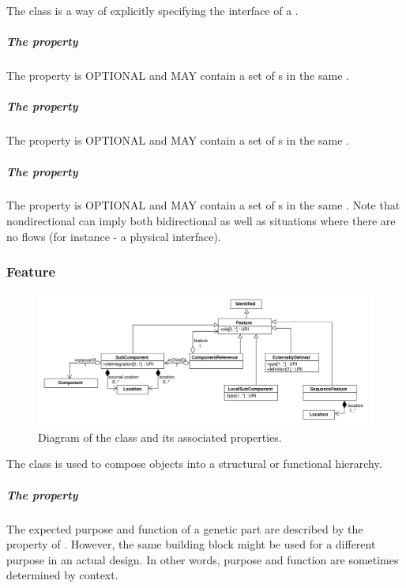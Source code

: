 The  class is a way of explicitly specifying the interface of a . 

\subparagraph{The  property}
\label{sec:input:Interface}
The  property is OPTIONAL and MAY contain a set of  s in the same .
\subparagraph{The  property}
\label{sec:output:Interface}
The  property is OPTIONAL and MAY contain a set of  s in the same .

\subparagraph{The  property}
\label{sec:nondirectional:Interface}
The  property is OPTIONAL and MAY contain a set of  s in the same . Note that nondirectional can imply both bidirectional as well as situations where there are no flows (for instance - a physical interface).


\subsubsection{Feature}
\label{sec:Feature}

\begin{figure}[ht]
\begin{center}
\includegraphics[width=\textwidth]{uml/feature}
\caption[]{Diagram of the  class and its associated properties.}
\label{uml:subcomponent}
\end{center}
\end{figure}

The  class is used to compose  objects into a structural or functional hierarchy. 

\subparagraph{The  property}\label{sec:roles:C}

The expected purpose and function of a genetic part are described by the
 property of . However, the same building block might be used for a different purpose in an actual design. In other words, purpose and function are sometimes determined by context. 

